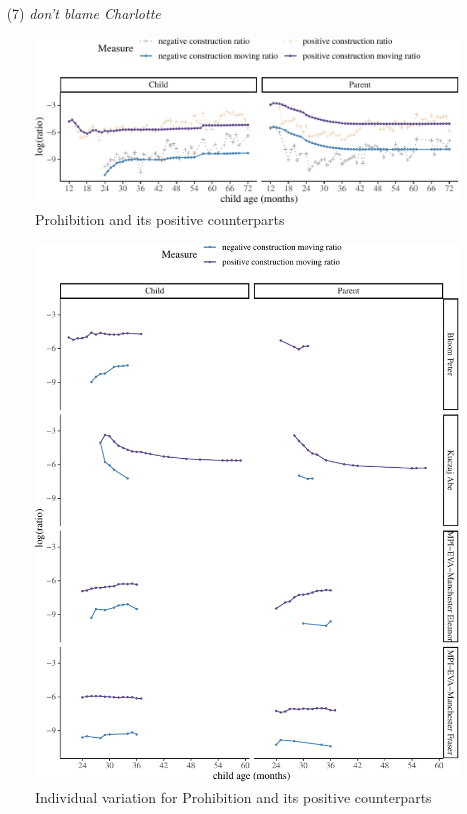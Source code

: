 \documentclass[
  english,
  man,floatsintext]{apa6}
\begin{document}
~
(7) \emph{don't blame Charlotte}

\begin{figure}[H]

{\centering \includegraphics{neg_construction_article_files/figure-latex/prohibition-1} 

}

\caption{Prohibition and its positive counterparts}\label{fig:prohibition}
\end{figure}

\begin{figure}[H]

{\centering \includegraphics{neg_construction_article_files/figure-latex/individualprohibition-1} 

}

\caption{Individual variation for Prohibition and its positive counterparts}\label{fig:individualprohibition}
\end{figure}
\end{document}
